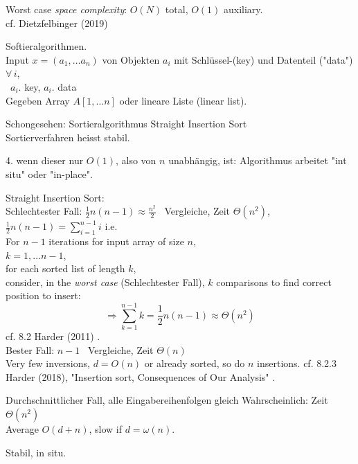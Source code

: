 \documentclass[10pt]{amsart}
\begin{document}
Worst case \emph{space complexity}: $O(N)$ total, $O(1)$ auxiliary. \\

cf. Dietzfelbinger (2019) \cite{Diet2019}

Softieralgorithmen. \\

Input $x = (a_1, \dots a_n)$ von Objekten $a_i$ mit Schl\"{u}ssel-(key) und Datenteil ("data") $\forall \, i$, \\
\quad \quad \, $a_i .$ key, $a_i . $ data \\

Gegeben Array $A[1,\dots n]$ oder lineare Liste (linear list).

Schongesehen: Sortieralgorithmus Straight Insertion Sort \\
Sortierverfahren heisst stabil.

4. wenn dieser nur $O(1)$, also von $n$ unabh\"{a}ngig, ist: Algorithmus arbeitet "int situ" oder "in-place".

Straight Insertion Sort: \\

Schlechtester Fall: $\frac{1}{2}n(n-1) \approx \frac{n^2}{2}$ \quad \, Vergleiche, Zeit $\Theta(n^2)$, \\
$\frac{1}{2} n (n-1) = \sum_{i=1}^{n-1} i $ i.e. \\

For $n-1$ iterations for input array of size $n$, \\
$k = 1, \dots n-1$, \\
for each sorted list of length $k$, \\
consider, in the \emph{worst case} (Schlechtester Fall), $k$ comparisons to find correct position to insert: 
\[
\Longrightarrow \sum_{k=1}^{n-1} k = \frac{1}{2} n ( n -1) \approx \Theta(n^2)
\]cf. 8.2 Harder (2011) \cite{Hard2018}. \\


Bester Fall: $n-1$ \, Vergleiche, Zeit $\Theta(n)$ \\ Very few inversions, $d= O(n)$ or already sorted, so do $n$ insertions. cf. 8.2.3 Harder (2018), "Insertion sort, Consequences of Our Analysis" \cite{Hard2018}. 

Durchschnittlicher Fall, alle Eingabereihenfolgen gleich Wahrscheinlich: Zeit $\Theta(n^2)$ \\

Average $O(d+n)$, slow if $d= \omega(n)$.

Stabil, in situ.
\end{document}
